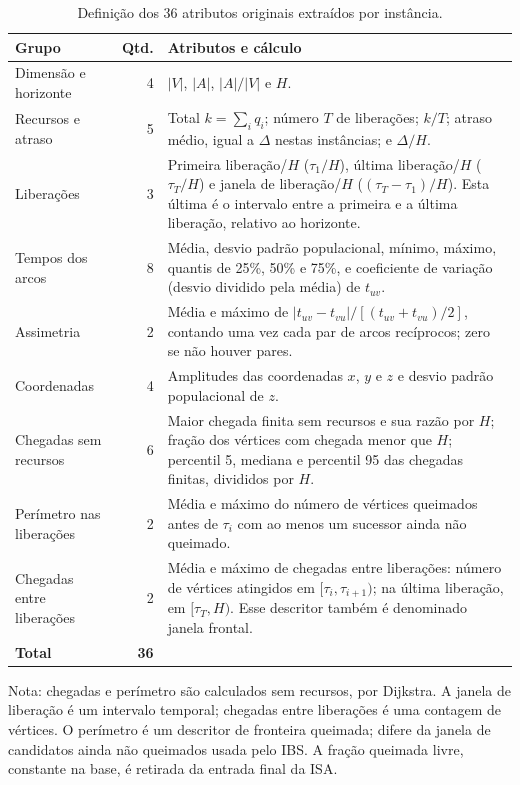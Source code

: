 \begin{table}[p]
\centering
\caption{Definição dos 36 atributos originais extraídos por instância.}
\label{tab:met-atributos-originais}
\begin{singlespace}
\setlength{\tabcolsep}{4pt}
\renewcommand{\arraystretch}{1.12}
\begin{tabular}{>{\raggedright\arraybackslash}p{2.35cm}r>{\raggedright\arraybackslash}p{9.8cm}}
\hline\hline
\textbf{Grupo} & \textbf{Qtd.} & \textbf{Atributos e cálculo}\\
\hline
Dimensão e horizonte & 4 & $|V|$, $|A|$, $|A|/|V|$ e $H$.\\
Recursos e atraso & 5 & Total $k=\sum_i q_i$; número $T$ de liberações; $k/T$; atraso médio, igual a $\Delta$ nestas instâncias; e $\Delta/H$.\\
Liberações & 3 & Primeira liberação/$H$ ($\tau_1/H$), última liberação/$H$ ($\tau_T/H$) e janela de liberação/$H$ ($(\tau_T-\tau_1)/H$). Esta última é o intervalo entre a primeira e a última liberação, relativo ao horizonte.\\
Tempos dos arcos & 8 & Média, desvio padrão populacional, mínimo, máximo, quantis de 25\%, 50\% e 75\%, e coeficiente de variação (desvio dividido pela média) de $t_{uv}$.\\
Assimetria & 2 & Média e máximo de $|t_{uv}-t_{vu}|/[(t_{uv}+t_{vu})/2]$, contando uma vez cada par de arcos recíprocos; zero se não houver pares.\\
Coordenadas & 4 & Amplitudes das coordenadas $x$, $y$ e $z$ e desvio padrão populacional de $z$.\\
Chegadas sem recursos & 6 & Maior chegada finita sem recursos e sua razão por $H$; fração dos vértices com chegada menor que $H$; percentil 5, mediana e percentil 95 das chegadas finitas, divididos por $H$.\\
Perímetro nas liberações & 2 & Média e máximo do número de vértices queimados antes de $\tau_i$ com ao menos um sucessor ainda não queimado.\\
Chegadas entre liberações & 2 & Média e máximo de chegadas entre liberações: número de vértices atingidos em $[\tau_i,\tau_{i+1})$; na última liberação, em $[\tau_T,H)$. Esse descritor também é denominado janela frontal.\\
\hline
\textbf{Total} & \textbf{36} & \\
\hline\hline
\end{tabular}
\par\smallskip
{\small Nota: chegadas e perímetro são calculados sem recursos, por Dijkstra.
A janela de liberação é um intervalo temporal; chegadas entre liberações é uma contagem de vértices.
O perímetro é um descritor de fronteira queimada; difere da
janela de candidatos ainda não queimados usada pelo IBS. A fração queimada
livre, constante na base, é retirada da entrada final da ISA.\par}
{}
\end{singlespace}
\end{table}

